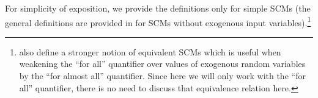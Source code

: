 For simplicity of exposition, we provide the definitions only for simple SCMs 
(the general definitions are provided in \cite{BFPM21} for SCMs without exogenous input variables).\footnote{\cite{BFPM21} also
define a stronger notion of equivalent SCMs which is useful when weakening the ``for all'' quantifier over values of
exogenous random variables by the ``for almost all'' quantifier. Since here we will only work with the ``for all'' quantifier, 
there is no need to discuss that equivalence relation here.}
